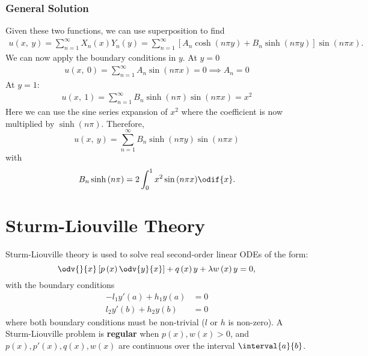 \documentclass{article}
\begin{document}
\subsubsection{General Solution}
Given these two functions, we can use superposition to find
\begin{align*}
    u\left( x,\: y \right) = \sum_{n = 1}^\infty X_n\left( x \right) Y_n\left( y \right) = \sum_{n = 1}^\infty \left[ A_n \cosh{\left( n \pi y \right)} + B_n \sinh{\left( n \pi y \right)} \right] \sin{\left( n \pi x \right)}.
\end{align*}
We can now apply the boundary conditions in \(y\). At \(y = 0\)
\begin{align*}
    u\left( x,\: 0 \right) = \sum_{n = 1}^\infty A_n \sin{\left( n \pi x \right)} = 0 \implies A_n = 0
\end{align*}
At \(y = 1\):
\begin{align*}
    u\left( x,\: 1 \right) = \sum_{n = 1}^\infty B_n \sinh{\left( n \pi \right)} \sin{\left( n \pi x \right)} = x^2
\end{align*}
Here we can use the sine series expansion of \(x^2\) where the coefficient is now multiplied by \(\sinh{\left( n \pi \right)}\).
Therefore,
\begin{equation*}
    u\left( x,\: y \right) = \sum_{n = 1}^\infty B_n \sinh{\left( n \pi y \right)} \sin{\left( n \pi x \right)}
\end{equation*}
with
\begin{equation*}
    B_n \sinh{\left( n \pi \right)} = 2 \int_0^1 x^2 \sin{\left( n \pi x \right)} \odif{x}.
\end{equation*}
\section{Sturm-Liouville Theory}
Sturm-Liouville theory is used to solve real second-order linear ODEs of the form:
\begin{equation*}
    \odv{}{x} \left[ p\left( x \right) \odv{y}{x} \right] + q\left( x \right) y + \lambda w\left( x \right) y = 0,
\end{equation*}
with the boundary conditions
\begin{align*}
    -l_1 y'\left( a \right) + h_1 y\left( a \right) & = 0 \\
    l_2 y'\left( b \right) + h_2 y\left( b \right) & = 0
\end{align*}
where both boundary conditions must be non-trivial (\(l\) or \(h\) is non-zero). A Sturm-Liouville problem is
\textbf{regular} when \(p\left( x \right), w\left( x \right) > 0\), and \(p\left( x \right), p'\left( x \right), q\left( x \right), w\left( x \right)\) are continuous
over the interval \(\interval{a}{b}\).
\end{document}
